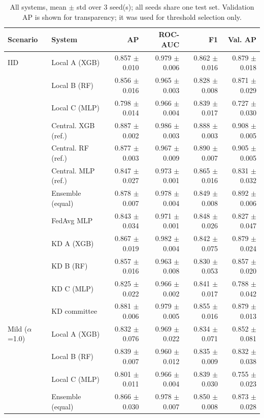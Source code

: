 \begin{table}[t]
\centering
\scriptsize
\caption{All systems, mean $\pm$ std over 3 seed(s); all seeds share one test set. Validation AP is shown for transparency; it was used for threshold selection only.}
\label{tab:seeds}
\begin{tabular}{llrrrr}
\toprule
Scenario & System & AP & ROC-AUC & F1 & Val. AP \\
\midrule
IID & Local A (XGB) & 0.857 $\pm$ 0.010 & 0.979 $\pm$ 0.006 & 0.862 $\pm$ 0.016 & 0.879 $\pm$ 0.018 \\
 & Local B (RF) & 0.856 $\pm$ 0.016 & 0.965 $\pm$ 0.003 & 0.828 $\pm$ 0.008 & 0.871 $\pm$ 0.029 \\
 & Local C (MLP) & 0.798 $\pm$ 0.014 & 0.966 $\pm$ 0.004 & 0.839 $\pm$ 0.017 & 0.727 $\pm$ 0.030 \\
 & Central. XGB (ref.) & 0.887 $\pm$ 0.002 & 0.986 $\pm$ 0.003 & 0.888 $\pm$ 0.003 & 0.908 $\pm$ 0.005 \\
 & Central. RF (ref.) & 0.877 $\pm$ 0.003 & 0.967 $\pm$ 0.009 & 0.890 $\pm$ 0.007 & 0.905 $\pm$ 0.005 \\
 & Central. MLP (ref.) & 0.847 $\pm$ 0.027 & 0.973 $\pm$ 0.001 & 0.865 $\pm$ 0.016 & 0.831 $\pm$ 0.032 \\
 & Ensemble (equal) & 0.878 $\pm$ 0.007 & 0.978 $\pm$ 0.004 & 0.849 $\pm$ 0.008 & 0.892 $\pm$ 0.006 \\
 & FedAvg MLP & 0.843 $\pm$ 0.034 & 0.971 $\pm$ 0.001 & 0.848 $\pm$ 0.026 & 0.827 $\pm$ 0.047 \\
 & KD A (XGB) & 0.867 $\pm$ 0.019 & 0.982 $\pm$ 0.004 & 0.842 $\pm$ 0.075 & 0.879 $\pm$ 0.024 \\
 & KD B (RF) & 0.857 $\pm$ 0.016 & 0.963 $\pm$ 0.008 & 0.830 $\pm$ 0.053 & 0.857 $\pm$ 0.020 \\
 & KD C (MLP) & 0.825 $\pm$ 0.022 & 0.966 $\pm$ 0.002 & 0.841 $\pm$ 0.017 & 0.788 $\pm$ 0.042 \\
 & KD committee & 0.881 $\pm$ 0.006 & 0.979 $\pm$ 0.005 & 0.855 $\pm$ 0.016 & 0.879 $\pm$ 0.013 \\
\midrule
Mild ($\alpha$=1.0) & Local A (XGB) & 0.832 $\pm$ 0.076 & 0.969 $\pm$ 0.022 & 0.834 $\pm$ 0.071 & 0.852 $\pm$ 0.081 \\
 & Local B (RF) & 0.839 $\pm$ 0.007 & 0.960 $\pm$ 0.012 & 0.835 $\pm$ 0.009 & 0.832 $\pm$ 0.038 \\
 & Local C (MLP) & 0.801 $\pm$ 0.011 & 0.966 $\pm$ 0.004 & 0.839 $\pm$ 0.030 & 0.755 $\pm$ 0.023 \\
 & Ensemble (equal) & 0.866 $\pm$ 0.030 & 0.978 $\pm$ 0.007 & 0.850 $\pm$ 0.008 & 0.873 $\pm$ 0.028 \\

\end{tabular}
\end{table}
